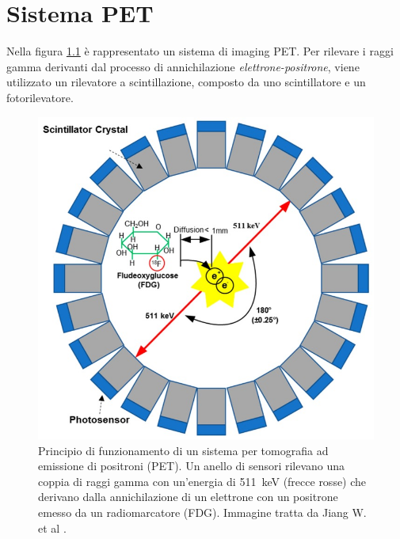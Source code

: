 \chapter{Sistema PET}
Nella figura \ref{fig:PET_imaging_system} è rappresentato un sistema di imaging PET. Per rilevare i raggi gamma derivanti dal processo di annichilazione \textit{elettrone-positrone}, viene utilizzato un rilevatore a scintillazione, composto da uno scintillatore e un fotorilevatore. 
\begin{figure}[h]
	\centering
	\includegraphics[width=0.5\linewidth]{./ImageFiles/PET_imaging_system}
	\caption{Principio di funzionamento di un sistema per tomografia ad emissione di positroni (PET). Un anello di sensori rilevano una coppia di raggi gamma con un'energia di \SI{511}{\kilo\electronvolt} (frecce rosse) che derivano dalla annichilazione di un elettrone con un positrone emesso da un radiomarcatore (FDG). Immagine tratta da Jiang W. et al \cite{Jiang2019}.}
	\label{fig:PET_imaging_system}
\end{figure}

